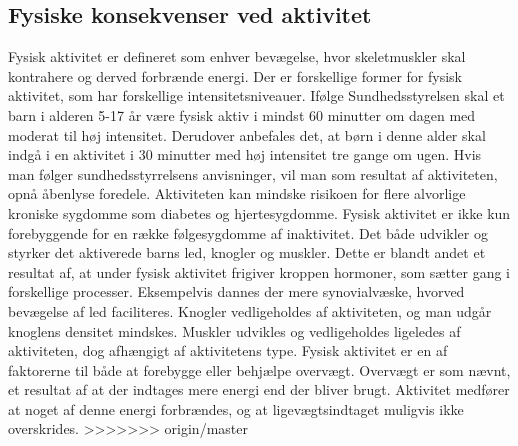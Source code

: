 \subsection{Fysiske konsekvenser ved aktivitet} \label{subsec:fysio_aktivitet}
Fysisk aktivitet er defineret som enhver bevægelse, hvor skeletmuskler skal kontrahere og derved forbrænde energi. Der er forskellige former for fysisk aktivitet, som har forskellige intensitetsniveauer. \citep{Academic2016a} Ifølge Sundhedsstyrelsen skal et barn i alderen 5-17 år være fysisk aktiv i mindst 60 minutter om dagen med moderat til høj intensitet. Derudover anbefales det, at børn i denne alder skal indgå i en aktivitet i 30 minutter med høj intensitet tre gange om ugen. \citep{Sundhedsstyrelsen2016} Hvis man følger sundhedsstyrrelsens anvisninger, vil man som resultat af aktiviteten, opnå åbenlyse foredele. Aktiviteten kan mindske risikoen for flere alvorlige kroniske sygdomme som diabetes og hjertesygdomme. Fysisk aktivitet er ikke kun forebyggende for en række følgesygdomme af inaktivitet. Det både udvikler og styrker det aktiverede barns led, knogler og muskler. Dette er blandt andet et resultat af, at under fysisk aktivitet frigiver kroppen hormoner, som sætter gang i forskellige processer. Eksempelvis dannes der mere synovialvæske, hvorved bevægelse af led faciliteres. Knogler vedligeholdes af aktiviteten, og man udgår knoglens densitet mindskes. Muskler udvikles og vedligeholdes ligeledes af aktiviteten, dog afhængigt af aktivitetens type. Fysisk aktivitet er en af faktorerne til både at forebygge eller behjælpe overvægt. Overvægt er som nævnt, et resultat af at der indtages mere energi end der bliver brugt. Aktivitet medfører at noget af denne energi forbrændes, og at ligevægtsindtaget muligvis ikke overskrides. \citep{Academic2016a,Smith1991,Academic2016b,Cotman2007,CenterforDiseaseControlandPrevention2015}
>>>>>>> origin/master

